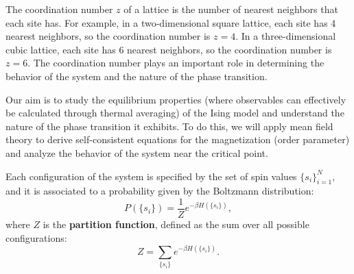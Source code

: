 \begin{definition}
    The coordination number \(z\) of a lattice is the number of nearest neighbors that each site has. For example, in a two-dimensional square lattice, each site has 4 nearest neighbors, so the coordination number is \(z = 4\). In a three-dimensional cubic lattice, each site has 6 nearest neighbors, so the coordination number is \(z = 6\). The coordination number plays an important role in determining the behavior of the system and the nature of the phase transition.
\end{definition}

Our aim is to study the equilibrium properties (where observables can effectively be calculated through thermal averaging) of the Ising model and understand the nature of the phase transition it exhibits. To do this, we will apply mean field theory to derive self-consistent equations for the magnetization (order parameter) and analyze the behavior of the system near the critical point.

Each configuration of the system is specified by the set of spin values \(\{s_i\}_{i=1}^N\), and it is associated to a probability given by the Boltzmann distribution:
\[
    P(\{s_i\}) = \frac{1}{Z} e^{-\beta H(\{s_i\})},
\]
where \(Z\) is the \textbf{partition function}, defined as the sum over all possible configurations:
\[
    Z = \sum_{\{s_i\}} e^{-\beta H(\{s_i\})}.
\]

